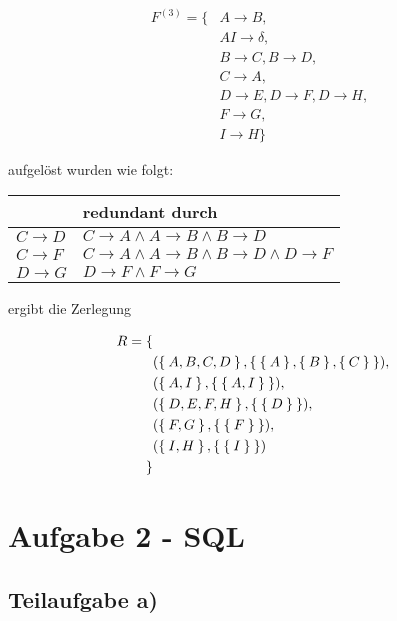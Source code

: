 \documentclass[a4paper,9pt]{scrartcl}
\begin{document}
\begin{align*}
F^{(3)} = \{  & A \rightarrow B,\\
    &AI \rightarrow \delta,\\
    & B \rightarrow C, B \rightarrow D,\\
    & C \rightarrow A,\\
    & D \rightarrow E,D \rightarrow F,D \rightarrow H,\\
    & F \rightarrow G,\\
    & I \rightarrow H 
\}
\end{align*}

aufgelöst wurden wie folgt:

  \begin{tabular}{l|l}
             & redundant durch\\
    \hline
    $C \rightarrow D$ & $C \rightarrow A \land A \rightarrow B \land B \rightarrow D$\\
    $C \rightarrow F$ & $C \rightarrow A \land A \rightarrow B \land B \rightarrow D \land D \rightarrow F$\\
    $D \rightarrow G$ & $D \rightarrow F \land F \rightarrow G$\\
  \end{tabular}

ergibt die Zerlegung 

\begin{align*}
    R = \{\\
            & (\Set{A, B, C, D}, \Set{\Set{A}, \Set{B}, \Set{C}}),\\
            &(\Set{A, I}, \Set{\Set{A, I}}),\\
            & (\Set{D, E, F, H},\Set{\Set{D}}),\\
            & (\Set{F, G}, \Set{\Set{F}}),\\
            & (\Set{I, H}, \Set{\Set{I}})\\
        \}
\end{align*}
\clearpage

\section{Aufgabe 2 - SQL}
\subsection{Teilaufgabe a)}
\end{document}
